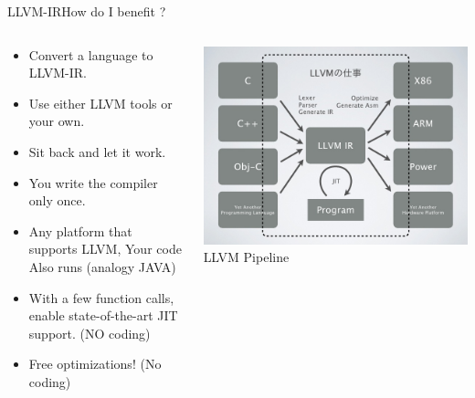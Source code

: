 \documentclass{beamer}
\begin{document}
\begin{frame}{LLVM-IR}{How do I benefit ?}
\begin{columns}[T]

\begin{column}{0.5\textwidth}
\begin{itemize}
    \item Convert a language to LLVM-IR.
    \item Use either LLVM tools or your own.
    \item Sit back and let it work.
    \item You write the compiler only \alert{once}.
    \item Any platform that supports LLVM, Your code Also runs (analogy JAVA)
    \item With a few function calls, enable state-of-the-art JIT support. (NO coding)
    \item Free optimizations! (No coding)
\end{itemize}

\end{column}

\begin{column}{0.5\textwidth}
\includegraphics[width=\textwidth]{llvmir}\\
LLVM Pipeline\footnotemark
{}

\end{column}
\end{columns}  
\end{frame}
\end{document}
